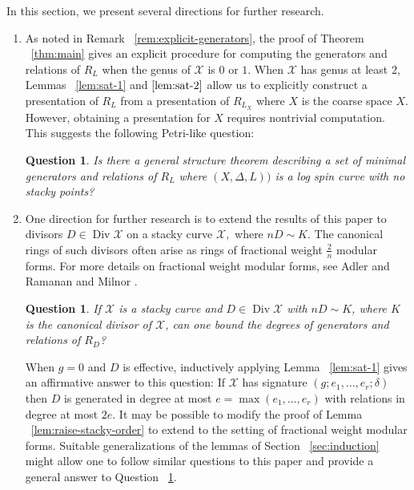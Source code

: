 \documentclass{amsart}
\theoremstyle{plain}
\newtheorem{question}[thm]{Question}
\theoremstyle{definition}
\theoremstyle{remark}
\numberwithin{equation}{section}
\DeclareMathOperator\di{Div}
\newcommand\sx{\mathscr X}
\newcommand{\halfcan}{L}
\begin{document}
In this section, we present several directions for further research.
\begin{enumerate}
	\item As noted in Remark ~\ref{rem:explicit-generators}, the 
		proof of Theorem ~\ref{thm:main} 
		gives an 
		explicit procedure for computing the generators and relations of $R_
		\halfcan$ when the genus of $\sx$ is $0$ or $1$.  When $\sx$ has genus at least 2, Lemmas ~\ref{lem:sat-1} and $\ref{lem:sat-2}$ allow us to explicitly construct a presentation of $R_\halfcan$ from a presentation of $R_{L_X}$ where $X$ is the coarse space $X$.  However, obtaining a presentation for $X$ requires nontrivial computation.  This suggests the following Petri-like question:
		\begin{question}
		\label{ques:spin-canonical-petri}
			Is there a general structure theorem describing a set of minimal 
			generators and relations of $R_{\halfcan}$ where $(X, \Delta, L))$ is a log spin curve with no stacky points?
		\end{question}
		
\item One direction for further research is to 
		extend the results of this paper to divisors $D \in \di \sx$ on a 
		stacky curve $\sx,$ where $nD \sim K.$ The canonical rings of such 
		divisors often arise as rings of fractional weight $\frac{2}{n}$ modular
		forms. For more details on fractional weight modular forms, see Adler and Ramanan \cite[p. 96]{adler:moduli} and Milnor \cite
		[$\mathsection$ 6]{milnor:fractional-weight}.

\begin{question}
		\label{ques:fractional-weight}
			If $\sx$ is a stacky curve and $D \in \di \sx$ with $nD \sim K$, 
			where $K$ is the canonical divisor of $\sx$, can one bound the 
			degrees of generators and relations of $R_D$?
		\end{question}
		When $g=0$ and $D$ is effective, inductively applying Lemma ~\ref{lem:sat-1}  
		gives an affirmative answer to this question: If $\sx$ has signature 
		$(g; e_1, \ldots, e_r; \delta)$ then $D$ is generated in degree at 
		most $e = \max(e_1, \ldots, e_r)$ with relations in degree at most
		$2e$. 
		It may be possible to modify the proof of Lemma
		~\ref{lem:raise-stacky-order} to extend to the setting of fractional 
		weight modular forms. 
		Suitable generalizations of the 
		lemmas of Section ~\ref{sec:induction} might allow one to 
		follow similar questions to this paper and provide a general 
		answer to Question ~\ref{ques:fractional-weight}.



\end{enumerate}
\end{document}

